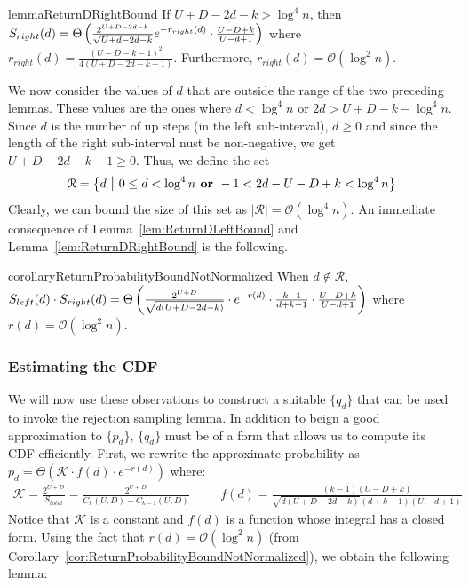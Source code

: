 \begin{restatable}{lemma}{ReturnDRightBound}
\label{lem:ReturnDRightBound}
If $U+D-2d-k > \log^4 n$, then $S_{right}(d)
= \Theta\left( \frac{2^{U+D-2d-k}}{\sqrt{U+d-2d-k}}\mathlarger e^{-r_{right}(d)}\cdot \frac{U-D+k}{U-d+1}\right)$
where $r_{right}(d) = \frac{(U-D-k-1)^2}{4(U+D-2d-k+1)}$.
Furthermore, $r_{right}(d)=\mathcal O(\log^2 n)$.
\end{restatable}

We now consider the values of $d$ that are outside the range of the two preceding lemmas.
These values are the ones where $d < \log^4 n$ or $2d > U+D-k-\log^4 n$.
Since $d$ is the number of up steps (in the left sub-interval), $d \ge 0$
and since the length of the right sub-interval nust be non-negative, we get $U+D-2d-k+1 \ge 0$.
Thus, we define the set
\[
    \mathcal R = \left\{ d\ \mathlarger|\ 0\le d < \log^4 n \textrm{\textbf{\ or\ }} -1 < 2d-U-D+k < \log^4 n \right\}
\]
Clearly, we can bound the size of this set as $|\mathcal R| = \mathcal O(\log^4 n)$.
An immediate consequence of Lemma~\ref{lem:ReturnDLeftBound} and Lemma~\ref{lem:ReturnDRightBound} is the following.

\begin{restatable}{corollary}{ReturnProbabilityBoundNotNormalized}
\label{cor:ReturnProbabilityBoundNotNormalized}
When $d\not \in \mathcal R$,
$S_{left}(d)\cdot S_{right}(d)
= \Theta\left( \frac{2^{U+D}}{\sqrt{d(U+D-2d-k)}}\cdot \mathlarger e^{-r(d)} \cdot \frac{k-1}{d+k-1}\cdot\frac{U-D+k}{U-d+1}\right)$
where $r(d)=\mathcal O(\log^2 n)$.
\end{restatable}



\subsubsection{Estimating the CDF}%
\label{sec:estimating_the_cdf}
We will now use these observations to construct a suitable $\{ q_d\}$ that can be used to invoke the rejection sampling lemma.
In addition to beign a good approximation to $\{ p_d\}$, $\{ q_d\}$ must be of a form that allows us to compute its CDF efficiently.
First, we rewrite the approximate probability as $p_d = \Theta\left(\mathcal K \cdot f(d)\cdot e^{-r(d)}\right)$ where:
\begin{align*}
    \mathcal K = \frac{2^{U+D}}{S_{total}} = \frac{2^{U+D}}{C_k(U,D)-C_{k-1}(U,D)}\ \ \ \
    &&f(d) = \frac{(k-1)(U-D+k)}{\sqrt{d(U+D-2d-k)}(d+k-1)(U-d+1)}
\end{align*}
Notice that $\mathcal K$ is a constant and $f(d)$ is a function whose integral has a closed form.
Using the fact that $r(d) = \mathcal O(\log^2 n)$ (from Corollary~\ref{cor:ReturnProbabilityBoundNotNormalized}), we obtain the following lemma:

